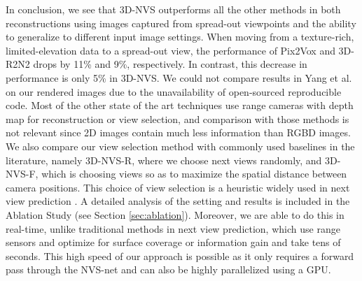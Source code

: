 In conclusion, we see that 3D-NVS outperforms all the other methods in both reconstructions using images captured from spread-out viewpoints and the ability to generalize to different input image settings. When moving from a texture-rich, limited-elevation data to a spread-out view, the performance of Pix2Vox and 3D-R2N2 drops by 11\% and 9\%, respectively. In contrast, this decrease in performance is only 5\% in 3D-NVS. We could not compare results in Yang et al. on our rendered images due to the unavailability of open-sourced reproducible code. Most of the other state of the art techniques use range cameras with depth map for reconstruction or view selection, and comparison with those methods is not relevant since 2D images contain much less information than RGBD images.
We also compare our view selection method with commonly used baselines in the literature, namely 3D-NVS-R, where we choose next views randomly, and 3D-NVS-F, which is choosing views so as to maximize the spatial distance between camera positions. This choice of view selection is a heuristic widely used in next view prediction \cite{shapenet,yang2018active,delmerico2018comparison, hashim2019next, ly2019autonomous}. A detailed analysis of the setting and results is included in the Ablation Study (see Section \ref{sec:ablation}). Moreover, we are able to do this in real-time, unlike traditional methods in next view prediction, which use range sensors and optimize for surface coverage or information gain and take tens of seconds. This high speed of our approach is possible as it only requires a forward pass through the NVS-net and can also be highly parallelized using a GPU.
